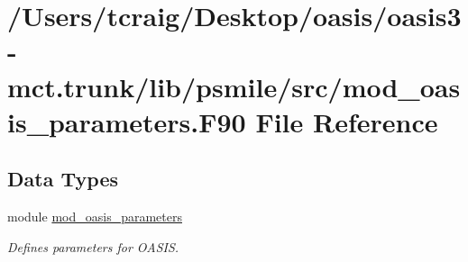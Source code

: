 \hypertarget{mod__oasis__parameters_8_f90}{\section{/\+Users/tcraig/\+Desktop/oasis/oasis3-\/mct.trunk/lib/psmile/src/mod\+\_\+oasis\+\_\+parameters.F90 File Reference}
\label{mod__oasis__parameters_8_f90}
}
\subsection*{Data Types}
\begin{DoxyCompactItemize}
\item 
module \hyperlink{classmod__oasis__parameters}{mod\+\_\+oasis\+\_\+parameters}
\begin{DoxyCompactList}\small\item\em Defines parameters for O\+A\+S\+I\+S. \end{DoxyCompactList}\end{DoxyCompactItemize}
